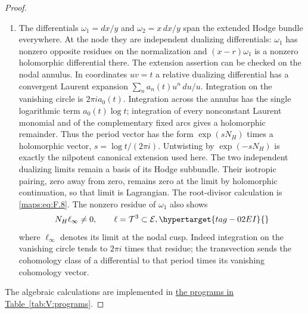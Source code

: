 \documentclass[11pt,a4paper]{article}
\numberwithin{equation}{section}
\theoremstyle{definition}
\begin{document}
\begin{proof}
\begin{enumerate}[label=\arabic*.]
\item The differentials $\omega_1=dx/y$ and $\omega_2=x\,dx/y$ span
the extended Hodge bundle everywhere.  At the node they are
independent dualizing differentials: $\omega_1$ has nonzero
opposite residues on the normalization and
$(x-r)\omega_1$ is a nonzero holomorphic differential there.
The extension assertion can be checked on the nodal annulus.
In coordinates $uv=t$ a relative dualizing differential has
a convergent Laurent expansion
$\sum_n a_n(t)u^n\,du/u$.  Integration on the vanishing circle
is $2\pi i a_0(t)$.  Integration across the annulus has the
single logarithmic term $a_0(t)\log t$; integration of every
nonconstant Laurent monomial and of the complementary fixed
arcs gives a holomorphic remainder.  Thus the period vector
has the form $\exp(sN_H)$ times a holomorphic vector,
$s=\log t/(2\pi i)$.  Untwisting by $\exp(-sN_H)$ is exactly
the nilpotent canonical extension used here.  The two independent
dualizing limits remain a basis of its Hodge subbundle.
Their isotropic pairing, zero away from zero, remains zero
at the limit by holomorphic continuation, so that limit is
Lagrangian.
The root-divisor calculation is \eqref{maps:eq:F.8}.
The nonzero residue of $\omega_1$ also shows
\begin{equation}
 N_H\ell_\infty\ne0,
 \qquad \ell=\mathcal T^3\subset\mathcal E,
 \hypertarget{tag-02EI}{}\label{maps:eq:F.12}
\end{equation}
where $\ell_\infty$ denotes its limit at the nodal cusp.
Indeed integration on the vanishing circle tends to
$2\pi i$ times that residue; the transvection sends the cohomology
class of a differential to that period times its vanishing
cohomology vector.

\end{enumerate}
The algebraic calculations are implemented in \hyperlink{prog:V:periods}{the programs in Table~\ref*{tab:V:programs}}.
\end{proof}
\end{document}
